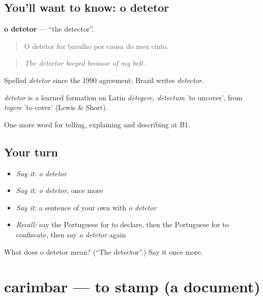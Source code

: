 \subsection*{You'll want to know: o detetor}
\textbf{o detetor} — \textquotedblleft{}the detector\textquotedblright{}.

\begin{quote}
O detetor fez barulho por causa do meu cinto.
\end{quote}

\begin{quote}
\emph{The detector beeped because of my belt.}
\end{quote}

Spelled \emph{detetor} since the 1990 agreement; Brazil writes \emph{detector}.

\begin{cousinweb}
\emph{detetor} is a learned formation on Latin \emph{dētegere, dētectum} 'to uncover', from \emph{tegere} 'to cover' (Lewis \& Short).
\end{cousinweb}

\begin{grammarlens}[title={What you've built}]
One more word for telling, explaining and describing at B1.
\end{grammarlens}

\subsection*{Your turn}
\begin{itemize}
\raggedright
  \item \emph{Say it:} \emph{o detetor}
  \item \emph{Say it:} \emph{o detetor}, once more
  \item \emph{Say it:} a sentence of your own with \emph{o detetor}
  \item \emph{Recall:} say the Portuguese for to declare, then the Portuguese for to confiscate, then say \emph{o detetor} again
\end{itemize}

\begin{tcolorbox}[breakable,colback=teal!4,colframe=teal!35!black,title={Before you move on}]
What does o detetor mean? (\textquotedblleft{}The detector\textquotedblright{}.) Say it once more.
\end{tcolorbox}
\section[carimbar]{carimbar — to stamp (a document)}

